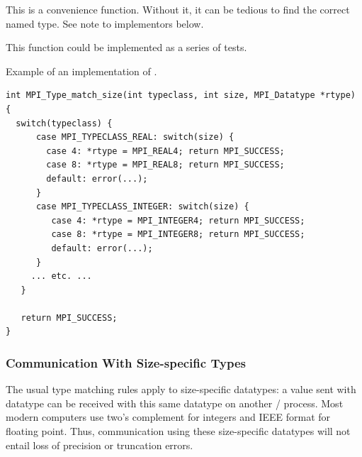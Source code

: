 \begin{rationale}
This is a convenience function. Without it, it can be tedious to
find the correct named type. See note to implementors below.
\end{rationale}
\begin{implementors}
This function could be implemented as a series of tests.
\begin{example}
Example of an implementation of .
\label{exa:lang:typematch:impl}
%
\begin{lstlisting}[language={[MPI]C},basicstyle=\lstsmall]
int MPI_Type_match_size(int typeclass, int size, MPI_Datatype *rtype)
{
  switch(typeclass) {
      case MPI_TYPECLASS_REAL: switch(size) {
        case 4: *rtype = MPI_REAL4; return MPI_SUCCESS;
        case 8: *rtype = MPI_REAL8; return MPI_SUCCESS;
        default: error(...);
      }
      case MPI_TYPECLASS_INTEGER: switch(size) {
         case 4: *rtype = MPI_INTEGER4; return MPI_SUCCESS;
         case 8: *rtype = MPI_INTEGER8; return MPI_SUCCESS;
         default: error(...);
      }
     ... etc. ...
   }

   return MPI_SUCCESS;
}
\end{lstlisting}
\end{example}
\end{implementors}

\subsubsection{Communication With Size-specific Types}

The usual type matching rules apply to size-specific datatypes: a
value sent with datatype
 can be received with this same datatype on
another \MPI/ process.
Most modern computers use two's complement for integers and
IEEE format for floating point.  Thus, communication using these
size-specific datatypes will not entail loss of precision or
truncation errors.


